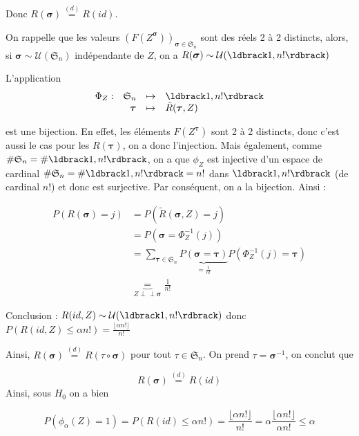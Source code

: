 \documentclass[12pt]{article}
\newcommand{\petitespace}{\vspace{0.5cm}}
\newcommand{\cercler}[1]{\tikz[baseline=(char.base)]{\node[shape=circle,draw,inner sep=1pt](char){#1};} }
\newcommand{\somme}[2]{\sum\limits_{#1}^{#2}}
\renewcommand{\cal}{\mathcal}
\newcommand{\indep}{\perp \!\!\! \perp} %
\newcommand{\1}{\bb{1}} %
\begin{document}
{Donc $R(\boldsymbol{\sigma}) \overset{(d)}{=}R(id)$.
\petitespace



\cercler 3 On rappelle que les valeurs $(F(Z^{\boldsymbol{\sigma}}))_{\boldsymbol{\sigma} \in \mathfrak{S}_n}$ sont des réels 2 à 2 distincts, alors, si $\boldsymbol{\sigma} \sim \cal U(\mathfrak{S}_n)$ indépendante de $Z$, on a $R(\boldsymbol{\sigma}) \sim \cal U(\ldbrack 1, n! \rdbrack)$   

\petitespace


L'application  $$
\begin{array}{rrrl} %

  \Phi_Z :& \mathfrak{S}_n &\mapsto& \ldbrack 1,n! \rdbrack\\
  & \boldsymbol{\tau} & \mapsto & \tilde R(\boldsymbol{\tau}, Z) \end{array}
$$

 est une bijection. En effet, les éléments $F(Z^{\boldsymbol{\tau}})$ sont 2 à 2 distincts, donc c'est aussi le cas pour les $R(\boldsymbol{\tau})$, on a donc l'injection. Mais également, comme $\# \mathfrak{S}_n = \#\ldbrack 1, n! \rdbrack$, on a que $\phi_Z$ est injective d'un espace de cardinal $\#\mathfrak{S}_n = \# \ldbrack 1,n!\rdbrack =n!$ dans $ \ldbrack 1,n!\rdbrack $ (de cardinal $n!$)  et donc est surjective. Par conséquent, on a la bijection. Ainsi :

\begin{align*}
	P(R(\boldsymbol{\sigma}) = j) &=P(\tilde R(\boldsymbol{\sigma}, Z)=j) \\
	&= P(\boldsymbol{\sigma} = \Phi_Z^{-1}(j))\\
	&= \somme{\boldsymbol{\tau} \in \mathfrak{S}_n}{}\underbrace{P(\boldsymbol{\sigma} = \boldsymbol{\tau})}_{=\frac{1}{n!}}P( \Phi_Z^{-1}(j) =  \boldsymbol{\tau} )\\
	&\underbrace{=}_{Z \indep \boldsymbol{\sigma} } \frac{1}{n!}
\end{align*}


Conclusion : $R(id, Z) \sim \cal U(\ldbrack 1, n! \rdbrack )$ donc $P(R(id, Z) \le \alpha n!) = \frac{\lfloor \alpha n! \rfloor}{n!}$

Ainsi, $R(\boldsymbol{\sigma}) \overset{(d)}{=}R(\tau \circ \boldsymbol{\sigma})$ pour tout $\tau\in \mathfrak{S}_n$. On prend $\tau = \boldsymbol{\sigma}^{-1}$, on conclut que 

$$R(\boldsymbol{\sigma})\overset{(d)}{=}R(id) $$
Ainsi, sous $H_0$ on a bien 

$$P(\phi_\alpha(Z) = 1) = P(R(id) \le \alpha n!) = \frac{\lfloor \alpha n! \rfloor}{n!} = \alpha \frac{\lfloor \alpha n! \rfloor}{\alpha n!} \le \alpha$$
}
\end{document}
